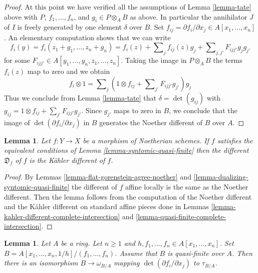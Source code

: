 \documentclass[10pt,a4paper]{amsart}
\theoremstyle{plain}
\newtheorem{lemma}[subsection]{Lemma}
\theoremstyle{definition}
\theoremstyle{remark}
\numberwithin{equation}{subsection}
\begin{document}
\begin{proof}
\medskip\noindent
At this point we have verified all the assumptions of Lemma \ref{lemma-tate}
above with $P$, $f_1, \ldots, f_n$, and $g_i \in P \otimes_A B$ as above.
In particular the annihilator $J$ of $I$ is freely generated by one
element $\delta$ over $B$.
Set $f_{ij} = \partial f_i/\partial x_j \in A[x_1, \ldots, x_n]$.
An elementary computation shows that we can write
$$
f_i(y) =
f_i(z_1 + g_1, \ldots, z_n + g_n) =
f_i(z) + \sum\nolimits_j f_{ij}(z) g_j +
\sum\nolimits_{j, j'} F_{ijj'}g_jg_{j'}
$$
for some $F_{ijj'} \in A[y_1, \ldots, y_n, z_1, \ldots, z_n]$.
Taking the image in $P \otimes_A B$ the terms $f_i(z)$ map to
zero and we obtain
$$
f_i \otimes 1 = \sum\nolimits_j
\left(1 \otimes f_{ij} + \sum\nolimits_{j'} F_{ijj'}g_{j'}\right)g_j
$$
Thus we conclude from Lemma \ref{lemma-tate}
that $\delta = \det(g_{ij})$ with
$g_{ij} = 1 \otimes f_{ij} + \sum_{j'} F_{ijj'}g_{j'}$.
Since $g_{j'}$ maps to zero in $B$, we conclude
that the image of $\det(\partial f_i/\partial x_j)$ in $B$
generates the Noether different of $B$ over $A$.
\end{proof}

\begin{lemma}
\label{lemma-different-syntomic-quasi-finite}
Let $f : Y \to X$ be a morphism of Noetherian schemes. If $f$
satisfies the equivalent conditions of Lemma \ref{lemma-syntomic-quasi-finite}
then the different $\mathfrak{D}_f$ of $f$ is the K\"ahler different
of $f$.
\end{lemma}

\begin{proof}
By Lemmas \ref{lemma-flat-gorenstein-agree-noether} and
\ref{lemma-dualizing-syntomic-quasi-finite}
the different of $f$ affine locally is the same as the
Noether different. Then the lemma follows from the
computation of the Noether different and the K\"ahler
different on standard affine pieces done in
Lemmas \ref{lemma-kahler-different-complete-intersection} and
\ref{lemma-quasi-finite-complete-intersection}.
\end{proof}

\begin{lemma}
\label{lemma-different-quasi-finite-complete-intersection}
Let $A$ be a ring. Let $n \geq 1$ and
$h, f_1, \ldots, f_n \in A[x_1, \ldots, x_n]$.
Set $B = A[x_1, \ldots, x_n, 1/h]/(f_1, \ldots, f_n)$.
Assume that $B$ is quasi-finite over $A$.
Then there is an isomorphism $B \to \omega_{B/A}$
mapping $\det(\partial f_i/\partial x_j)$ to $\tau_{B/A}$.
\end{lemma}
\end{document}
